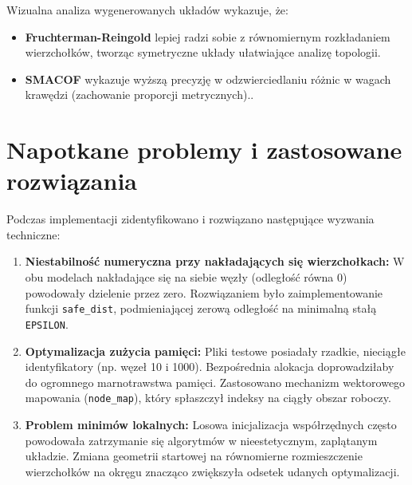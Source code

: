 \documentclass[12pt,a4paper]{article}
\begin{document}
Wizualna analiza wygenerowanych układów wykazuje, że:
\begin{itemize}
    \item \textbf{Fruchterman-Reingold} lepiej radzi sobie z równomiernym rozkładaniem wierzchołków, tworząc symetryczne układy ułatwiające analizę topologii.
    \item \textbf{SMACOF} wykazuje wyższą precyzję w odzwierciedlaniu różnic w wagach krawędzi (zachowanie proporcji metrycznych)..
\end{itemize}


\section{Napotkane problemy i zastosowane rozwiązania}
Podczas implementacji zidentyfikowano i rozwiązano następujące wyzwania techniczne:
\begin{enumerate}
    \item \textbf{Niestabilność numeryczna przy nakładających się wierzchołkach:} W obu modelach nakładające się na siebie węzły (odległość równa 0) powodowały dzielenie przez zero. Rozwiązaniem było zaimplementowanie funkcji \texttt{safe\_dist}, podmieniającej zerową odległość na minimalną stałą \texttt{EPSILON}.
    \item \textbf{Optymalizacja zużycia pamięci:} Pliki testowe posiadały rzadkie, nieciągłe identyfikatory (np. węzeł 10 i 1000). Bezpośrednia alokacja doprowadziłaby do ogromnego marnotrawstwa pamięci. Zastosowano mechanizm wektorowego mapowania (\texttt{node\_map}), który spłaszczył indeksy na ciągły obszar roboczy.
    \item \textbf{Problem minimów lokalnych:} Losowa inicjalizacja współrzędnych często powodowała zatrzymanie się algorytmów w nieestetycznym, zaplątanym układzie. Zmiana geometrii startowej na równomierne rozmieszczenie wierzchołków na okręgu znacząco zwiększyła odsetek udanych optymalizacji.
\end{enumerate}
\end{document}
